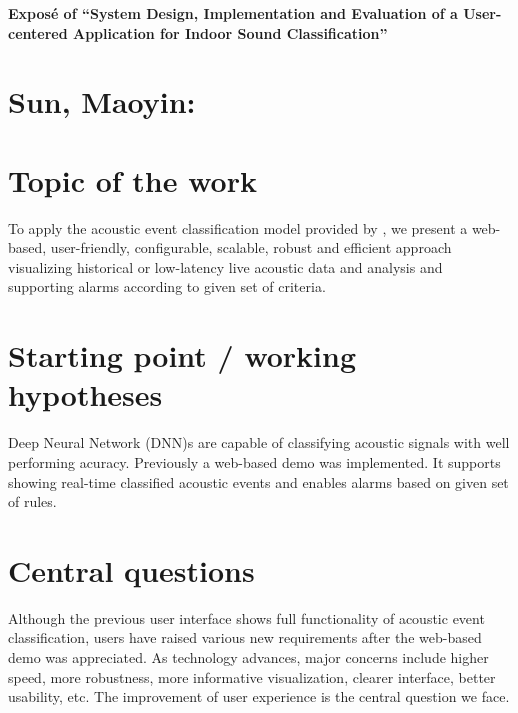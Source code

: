 \documentclass[12pt]{scrartcl}
\begin{document}
\begin{center}
\textbf{\fontsize{16}{16}\selectfont Exposé of ``System Design, Implementation and Evaluation of a User-centered Application for Indoor Sound Classification''}
\end{center}

\bigskip

\section*{Sun, Maoyin:  }

\section*{Topic of the work} %

To apply the acoustic event classification model provided by \cite{sampath2019cnn}, we present a web-based, user-friendly, configurable, scalable, robust and efficient approach visualizing historical or low-latency live acoustic data and analysis and supporting alarms according to given set of criteria.

\section*{Starting point / working hypotheses} %

Deep Neural Network (DNN)s are capable of classifying acoustic signals with well performing acuracy\cite{sampath2020low}. Previously a web-based demo was implemented\cite{sampath2019realtime}. It supports showing real-time classified acoustic events and enables alarms based on given set of rules.

\section*{Central questions} %

Although the previous user interface shows full functionality of acoustic event classification, users have raised various new requirements\cite{citationrequired} after the web-based demo was appreciated. As technology advances, major concerns include higher speed, more robustness, more informative visualization, clearer interface, better usability, etc. The improvement of user experience is the central question we face.

\end{document}
